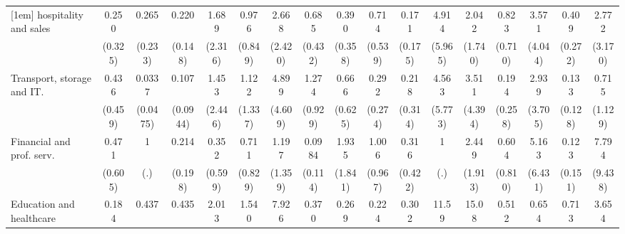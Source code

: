 {\begin{tabular}{l*{16}{c}}
[1em]
hospitality and sales&       0.250         &       0.265         &       0.220\sym{*}  &       1.689         &       0.976         &       2.668         &       0.685         &       0.390         &       0.714         &       0.171         &       4.914         &       2.042         &       0.823         &       3.571         &       0.409         &       2.772         \\
                    &     (0.325)         &     (0.233)         &     (0.148)         &     (2.316)         &     (0.849)         &     (2.420)         &     (0.432)         &     (0.358)         &     (0.539)         &     (0.175)         &     (5.965)         &     (1.740)         &     (0.710)         &     (4.044)         &     (0.272)         &     (3.170)         \\
[1em]
Transport, storage and IT.&       0.436         &      0.0337\sym{*}  &       0.107\sym{*}  &       1.453         &       1.122         &       4.899         &       1.274         &       0.666         &       0.292         &       0.218         &       4.563         &       3.511         &       0.194         &       2.939         &       0.133\sym{*}  &       0.715         \\
                    &     (0.459)         &    (0.0475)         &    (0.0944)         &     (2.446)         &     (1.337)         &     (4.609)         &     (0.929)         &     (0.625)         &     (0.274)         &     (0.314)         &     (5.773)         &     (4.394)         &     (0.258)         &     (3.705)         &     (0.128)         &     (1.129)         \\
[1em]
Financial and prof. serv.&       0.471         &           1         &       0.214         &       0.352         &       0.711         &       1.197         &      0.0984\sym{*}  &       1.935         &       1.006         &       0.316         &           1         &       2.449         &       0.604         &       5.163         &       0.123         &       7.794         \\
                    &     (0.605)         &         (.)         &     (0.198)         &     (0.599)         &     (0.829)         &     (1.359)         &     (0.114)         &     (1.841)         &     (0.967)         &     (0.422)         &         (.)         &     (1.913)         &     (0.810)         &     (6.431)         &     (0.151)         &     (9.438)         \\
[1em]
Education and healthcare&       0.184         &       0.437         &       0.435         &       2.013         &       1.540         &       7.926\sym{*}  &       0.370         &       0.269         &       0.224         &       0.302         &       11.59         &       15.08\sym{*}  &       0.512         &       0.654         &       0.713         &       3.654         \\

\end{tabular}}
